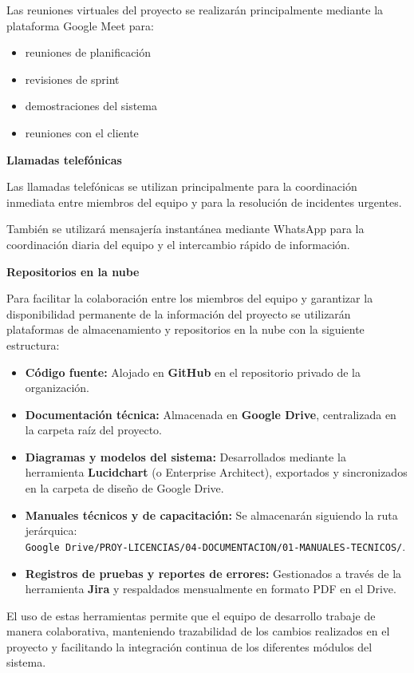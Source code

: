 Las reuniones virtuales del proyecto se realizarán principalmente mediante la plataforma Google Meet para:

\begin{itemize}
\item reuniones de planificación
\item revisiones de sprint
\item demostraciones del sistema
\item reuniones con el cliente
\end{itemize}

\textbf{Llamadas telefónicas}

Las llamadas telefónicas se utilizan principalmente para la coordinación inmediata entre miembros del equipo y para la resolución de incidentes urgentes.

También se utilizará mensajería instantánea mediante WhatsApp para la coordinación diaria del equipo y el intercambio rápido de información.

\textbf{Repositorios en la nube}

Para facilitar la colaboración entre los miembros del equipo y garantizar la disponibilidad permanente de la información del proyecto se utilizarán plataformas de almacenamiento y repositorios en la nube con la siguiente estructura:

\begin{itemize}
\item \textbf{Código fuente:} Alojado en \textbf{GitHub} en el repositorio privado de la organización.
\item \textbf{Documentación técnica:} Almacenada en \textbf{Google Drive}, centralizada en la carpeta raíz del proyecto.
\item \textbf{Diagramas y modelos del sistema:} Desarrollados mediante la herramienta \textbf{Lucidchart} (o Enterprise Architect), exportados y sincronizados en la carpeta de diseño de Google Drive.
\item \textbf{Manuales técnicos y de capacitación:} Se almacenarán siguiendo la ruta jerárquica: \\ 
\texttt{Google Drive/PROY-LICENCIAS/04-DOCUMENTACION/01-MANUALES-TECNICOS/}.
\item \textbf{Registros de pruebas y reportes de errores:} Gestionados a través de la herramienta \textbf{Jira} y respaldados mensualmente en formato PDF en el Drive.
\end{itemize}

El uso de estas herramientas permite que el equipo de desarrollo trabaje de manera colaborativa, manteniendo trazabilidad de los cambios realizados en el proyecto y facilitando la integración continua de los diferentes módulos del sistema.
